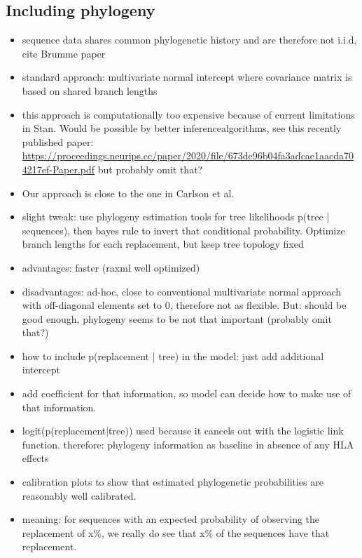 \documentclass[fleqn,11pt]{SelfArx} %
\begin{document}
\subsection*{Including phylogeny}
\begin{itemize}
  \item sequence data shares common phylogenetic history and are therefore not i.i.d, cite Brumme paper
  \item standard approach: multivariate normal intercept where covariance matrix is based on shared branch lengths
  \item this approach is computationally too expensive because of current limitations in Stan. Would be possible by better inferencealgorithms, see this recently published paper: \sloppy\url{https://proceedings.neurips.cc/paper/2020/file/673de96b04fa3adcae1aacda704217ef-Paper.pdf} but probably omit that?
  \item Our approach is close to the one in Carlson et al.
  \item slight tweak: use phylogeny estimation tools for tree likelihoods p(tree | sequences), then bayes rule to invert that conditional probability. Optimize branch lengths for each replacement, but keep tree topology fixed
  \item advantages: faster (raxml well optimized)
  \item disadvantages: ad-hoc, close to conventional multivariate normal    approach with off-diagonal elements set to 0, therefore not as flexible. But: should be good enough, phylogeny seems to be not that important (probably omit that?)
  \item how to include p(replacement | tree) in the model: just add additional intercept
  \item add coefficient for that information, so model can decide how to make use of that information.
  \item logit(p(replacement|tree)) used because it cancels out with the logistic
    link function. therefore: phylogeny information as baseline in absence of any HLA effects
  \item calibration plots to show that estimated phylogenetic probabilities are reasonably well calibrated.
  \item meaning: for sequences with an expected probability of observing the replacement of x\%, we really do see that x\% of the sequences have that replacement.
\end{itemize}
\end{document}
